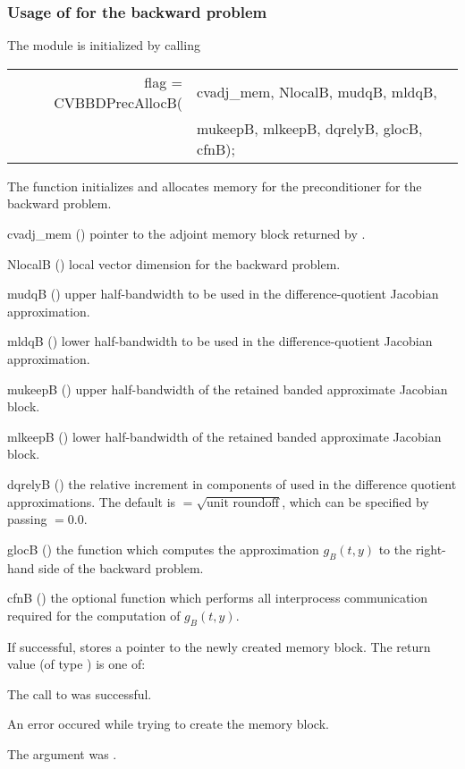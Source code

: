 \subsubsection{Usage of {\cvbbdpre} for the backward problem}
The {\cvbbdpre} module is initialized by calling
{
  \begin{tabular}[t]{@{}r@{}l@{}}
    flag = CVBBDPrecAllocB(&cvadj\_mem, NlocalB, mudqB, mldqB, \\
                           &mukeepB, mlkeepB, dqrelyB, glocB, cfnB);
  \end{tabular}
}
{
  The function  initializes and allocates
  memory for the {\cvbbdpre} preconditioner for the backward problem.
}
{
  \begin{args}
  \item[cvadj\_mem] ()
    pointer to the adjoint memory block returned by .
  \item[NlocalB] ()
    local vector dimension for the backward problem.
  \item[mudqB] ()
    upper half-bandwidth to be used in the difference-quotient Jacobian approximation.
  \item[mldqB] ()
    lower half-bandwidth to be used in the difference-quotient Jacobian approximation.
  \item[mukeepB] ()
    upper half-bandwidth of the retained banded approximate Jacobian block.
  \item[mlkeepB] ()
    lower half-bandwidth of the retained banded approximate Jacobian block.
  \item[dqrelyB] ()
    the relative increment in components of  used in the difference quotient
    approximations.  The default is $ = \sqrt{\text{unit roundoff}}$, which
    can be specified by passing $ = 0.0$.
  \item[glocB] ()
    the {\C} function which computes the approximation $g_B(t,y)$ to the right-hand
    side of the backward problem. 
  \item[cfnB] ()
    the optional {\C} function which performs all interprocess communication required for
    the computation of $g_B(t,y)$.
  \end{args}
}
{
  If successful,  stores a pointer to the newly created 
  {\cvbbdpre} memory block.
  The return value  (of type ) is one of:
  \begin{args}
  \item[\Id{CV\_SUCCESS}]
    The call to  was successful.
  \item[\Id{CV\_PDATA\_NULL}]
    An error occured while trying to create the {\cvbbdpre} memory block.
  \item[\Id{CV\_ADJMEM\_NULL}]
    The  argument was .
  \end{args}
}
